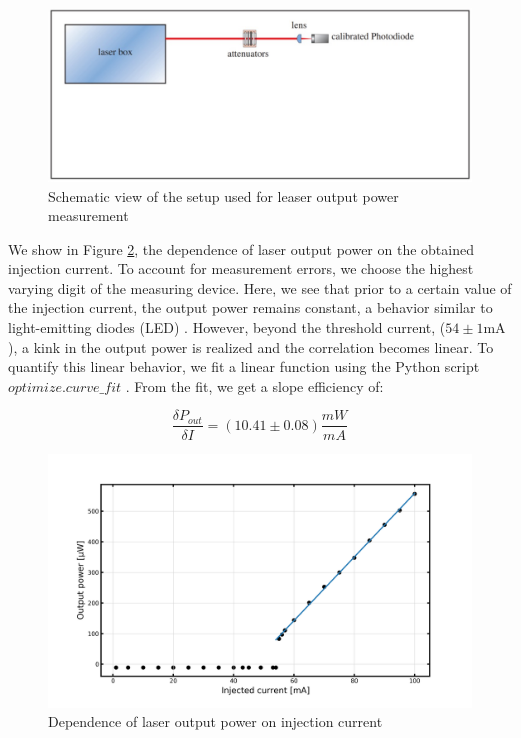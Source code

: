 \documentclass[12pt]{article}
\begin{document}
\begin{figure}[H]
    \centering
    \includegraphics[width = \textwidth]{fig/setup1.jpg}
    \caption{Schematic view of the setup used for leaser output power measurement\cite{lecturenote}}
    \label{fig1}
\end{figure}

We show in Figure \ref{fig2}, the dependence of laser output power on the obtained injection current. To account for measurement errors, we choose the highest varying digit of the measuring device. Here, we see that prior to a certain value of the injection current, the output power remains constant, a behavior similar to light-emitting diodes (LED) \cite{led}. However, beyond the threshold current,  ($54 \pm 1 \mathrm{mA}$), a kink in the output power is realized and the correlation becomes linear. To quantify this linear behavior, we fit a linear function using the Python script $optimize.curve\_fit$ \cite{scipy}.  From the fit, we get a slope efficiency of:

\begin{equation*}
    \frac{\delta P_{out}}{\delta I} 
    = (10.41 \pm 0.08) \frac{mW}{mA} 
\end{equation*}


\begin{figure}[H]
    \centering
    \includegraphics[width = \textwidth]{fig/Laserchar.png}
    \caption{Dependence of laser output power on injection current}
    \label{fig2}
\end{figure}
\end{document}
